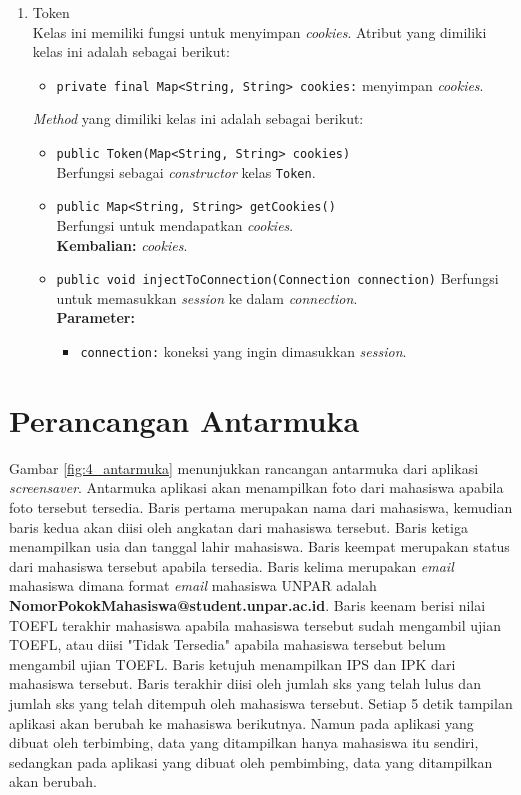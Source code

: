 \begin{enumerate}
\item{Token}\\
Kelas ini memiliki fungsi untuk menyimpan \textit{cookies}. Atribut yang dimiliki kelas ini adalah sebagai berikut:
	\begin{itemize}
        \item \texttt{private final Map<String, String> cookies:} menyimpan \textit{cookies}.
	\end{itemize}
	
	\textit{Method} yang dimiliki kelas ini adalah sebagai berikut:
	\begin{itemize}
	    \item \texttt{public Token(Map<String, String> cookies)}\\
	    Berfungsi sebagai \textit{constructor} kelas \texttt{Token}.
	    
	    \item \texttt{public Map<String, String> getCookies()}\\
	    Berfungsi untuk mendapatkan \textit{cookies}.\\
        \textbf{Kembalian:} \textit{cookies}.
        
        \item \texttt{public void injectToConnection(Connection connection)}
        Berfungsi untuk memasukkan \textit{session} ke dalam \textit{connection}.\\
        \textbf{Parameter:}
		\begin{itemize}
		    \item \texttt{connection:} koneksi yang ingin dimasukkan \textit{session}.
		\end{itemize}
    \end{itemize}
\end{enumerate}

\section{Perancangan Antarmuka}
Gambar \ref{fig:4_antarmuka} menunjukkan rancangan antarmuka dari aplikasi \textit{screensaver}. Antarmuka aplikasi akan menampilkan foto dari mahasiswa apabila foto tersebut tersedia. Baris pertama merupakan nama dari mahasiswa, kemudian baris kedua akan diisi oleh angkatan dari mahasiswa tersebut. Baris ketiga menampilkan usia dan tanggal lahir mahasiswa. Baris keempat merupakan status dari mahasiswa tersebut apabila tersedia. Baris kelima merupakan \textit{email} mahasiswa dimana format \textit{email} mahasiswa UNPAR adalah \textbf{NomorPokokMahasiswa@student.unpar.ac.id}. Baris keenam berisi nilai TOEFL terakhir mahasiswa apabila mahasiswa tersebut sudah mengambil ujian TOEFL, atau diisi "Tidak Tersedia" apabila mahasiswa tersebut belum mengambil ujian TOEFL. Baris ketujuh menampilkan IPS dan IPK dari mahasiswa tersebut. Baris terakhir diisi oleh jumlah sks yang telah lulus dan jumlah sks yang telah ditempuh oleh mahasiswa tersebut. Setiap 5 detik tampilan aplikasi akan berubah ke mahasiswa berikutnya. Namun pada aplikasi yang dibuat oleh terbimbing, data yang ditampilkan hanya mahasiswa itu sendiri, sedangkan pada aplikasi yang dibuat oleh pembimbing, data yang ditampilkan akan berubah.

